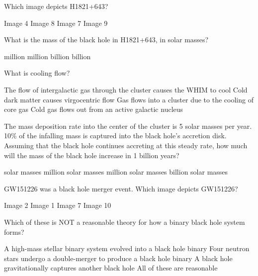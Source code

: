 \documentclass{exam}
\begin{document}
\begin{multicols*}{2}
\begin{questions}
\setcounter{question}{4}
\question Which image depicts H1821+643?
	\begin{choices}
	\CorrectChoice Image 4
	\choice Image 8
	\choice Image 7
	\choice Image 9
	\end{choices}
\end{questions}
\vfill\null\columnbreak
\begin{questions}
\setcounter{question}{5}
\question What is the mass of the black hole in H1821+643, in solar masses?
	\begin{choices}
	 million
	 million
	 billion
	 billion 
	\end{choices}
\question What is cooling flow?
	\begin{choices}
	\choice The flow of intergalactic gas through the cluster causes the WHIM to cool
	\choice Cold dark matter causes virgocentric flow
	\CorrectChoice Gas flows into a cluster due to the cooling of core gas
	\choice Cold gas flows out from an active galactic nucleus
	\end{choices}
\question The mass deposition rate into the center of the cluster is 5 solar masses per year. 10\% of the infalling mass is captured into the black hole’s accretion disk. Assuming that the black hole continues accreting at this steady rate, how much will the mass of the black hole increase in 1 billion years?
	\begin{choices}
	 solar masses
	 million solar masses
	 million solar masses 
	 billion solar masses
	\end{choices}
\end{questions}
\hrulefill
\begin{questions}
\setcounter{question}{8}
\question GW151226 was a black hole merger event. Which image depicts GW151226?
	\begin{choices}
	\CorrectChoice Image 2
	\choice Image 1
	\choice Image 7
	\choice Image 10
	\end{choices}
\question Which of these is NOT a reasonable theory for how a binary black hole system forms?
	\begin{choices}
	\choice A high-mass stellar binary system evolved into a black hole binary
	\CorrectChoice Four neutron stars undergo a double-merger to produce a black hole binary 
	\choice A black hole gravitationally captures another black hole
	\choice All of these are reasonable
	\end{choices}
\end{questions}

\end{multicols*}
\end{document}
